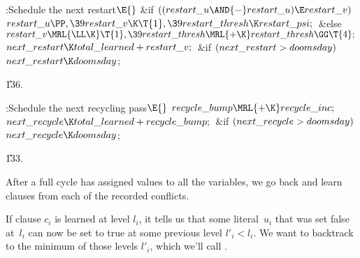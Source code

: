 \B{}:Schedule the next restart\X${}\E{}$\6
\&{if} ${}((\\{restart\_u}\AND{-}\\{restart\_u})\E\\{restart\_v}){}$\1\5
${}\\{restart\_u}\PP,\39\\{restart\_v}\K\T{1},\39\\{restart\_thresh}\K%
\\{restart\_psi};{}$\2\6
\&{else}\1\5
${}\\{restart\_v}\MRL{{\LL}{\K}}\T{1},\39\\{restart\_thresh}\MRL{+{\K}}%
\\{restart\_thresh}\GG\T{4};{}$\2\6
${}\\{next\_restart}\K\\{total\_learned}+\\{restart\_v};{}$\6
\&{if} ${}(\\{next\_restart}>\\{doomsday}){}$\1\5
${}\\{next\_restart}\K\\{doomsday}{}$;\2\par
\U136.\fi

\B{}:Schedule the next recycling pass\X${}\E{}$\6
$\\{recycle\_bump}\MRL{+{\K}}\\{recycle\_inc};{}$\6
${}\\{next\_recycle}\K\\{total\_learned}+\\{recycle\_bump};{}$\6
\&{if} ${}(\\{next\_recycle}>\\{doomsday}){}$\1\5
${}\\{next\_recycle}\K\\{doomsday}{}$;\2\par
\U133.\fi

After a full cycle has assigned values to all the
variables,
we go back and learn clauses from each of the recorded conflicts.

If clause $c_i$ is learned at level $l_i$, it tells us that some literal~$u_i$
that was set false at~$l_i$ can now be set to true at some previous level
$l'_i<l_i$. We want to backtrack to the minimum of those levels $l'_i$, which
we'll call .


